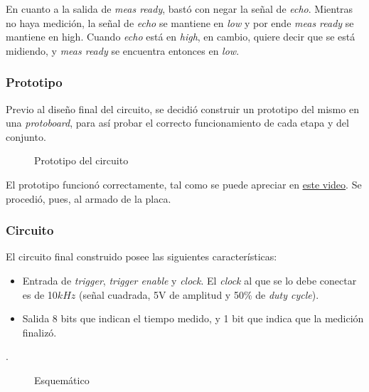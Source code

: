 \documentclass[../../e3_tp2_main.tex]{subfiles}
\begin{document}
En cuanto a la salida de \textit{meas ready}, bast\'o con negar la señal de \textit{echo}. Mientras no haya medición, la señal de \textit{echo} se mantiene en \textit{low} y por ende \textit{meas ready} se mantiene en high. Cuando \textit{echo} está en \textit{high}, en cambio, quiere decir que se está midiendo, y \textit{meas ready} se encuentra entonces en \textit{low}.

\subsubsection{Prototipo}
Previo al diseño final del circuito, se decidió construir un prototipo del mismo en una \textit{protoboard}, para así probar el correcto funcionamiento de cada etapa y del conjunto. 
\begin{figure}[H]	
	\centering
	\caption{Prototipo del circuito}
\end{figure}
El prototipo funcion\'o correctamente, tal como se puede apreciar en \href{https://youtu.be/xzRgiA1r85w}{\underline{este video}}. Se procedió, pues, al armado de la placa.
\subsubsection{Circuito}

El circuito final construido posee las siguientes características:
\begin{itemize}
	\item Entrada de \textit{trigger}, \textit{trigger enable} y \textit{clock}. El \textit{clock} al que se lo debe conectar es de 10$kHz$ (señal cuadrada, 5V de amplitud y 50\% de \textit{duty cycle}).
	\item Salida 8 bits que indican el tiempo medido, y 1 bit que indica que la medición finaliz\'o.
\end{itemize}
.
\begin{figure}[H]	
	\centering
	\caption{Esquem\'atico}
\end{figure}
\end{document}
